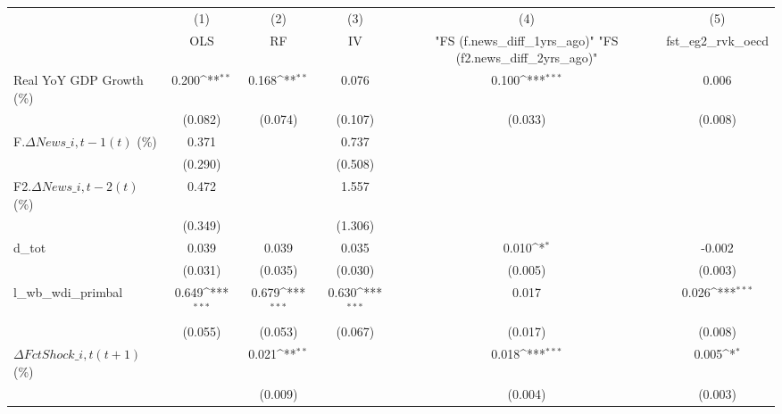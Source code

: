{
\def\sym#1{\ifmmode^{#1}\else\(^{#1}\)\fi}
\begin{tabular}{l*{5}{c}}
\toprule
                    &\multicolumn{1}{c}{(1)}&\multicolumn{1}{c}{(2)}&\multicolumn{1}{c}{(3)}&\multicolumn{1}{c}{(4)}&\multicolumn{1}{c}{(5)}\\
                    &\multicolumn{1}{c}{OLS}&\multicolumn{1}{c}{RF}&\multicolumn{1}{c}{IV}&\multicolumn{1}{c}{ "FS (f.news\_diff\_1yrs\_ago)"  "FS (f2.news\_diff\_2yrs\_ago)" }&\multicolumn{1}{c}{fst\_eg2\_rvk\_oecd}\\
\midrule
Real YoY GDP Growth (\%)&       0.200\sym{**} &       0.168\sym{**} &       0.076         &       0.100\sym{***}&       0.006         \\
                    &     (0.082)         &     (0.074)         &     (0.107)         &     (0.033)         &     (0.008)         \\
\addlinespace
F.$ \Delta News\_{i,t-1}(t)$ (\%)&       0.371         &                     &       0.737         &                     &                     \\
                    &     (0.290)         &                     &     (0.508)         &                     &                     \\
\addlinespace
F2.$ \Delta News\_{i,t-2}(t)$ (\%)&       0.472         &                     &       1.557         &                     &                     \\
                    &     (0.349)         &                     &     (1.306)         &                     &                     \\
\addlinespace
d\_tot               &       0.039         &       0.039         &       0.035         &       0.010\sym{*}  &      -0.002         \\
                    &     (0.031)         &     (0.035)         &     (0.030)         &     (0.005)         &     (0.003)         \\
\addlinespace
l\_wb\_wdi\_primbal    &       0.649\sym{***}&       0.679\sym{***}&       0.630\sym{***}&       0.017         &       0.026\sym{***}\\
                    &     (0.055)         &     (0.053)         &     (0.067)         &     (0.017)         &     (0.008)         \\
\addlinespace
$ \Delta FctShock\_{i,t}(t+1)$ (\%)&                     &       0.021\sym{**} &                     &       0.018\sym{***}&       0.005\sym{*}  \\
                    &                     &     (0.009)         &                     &     (0.004)         &     (0.003)         \\

\end{tabular}}
